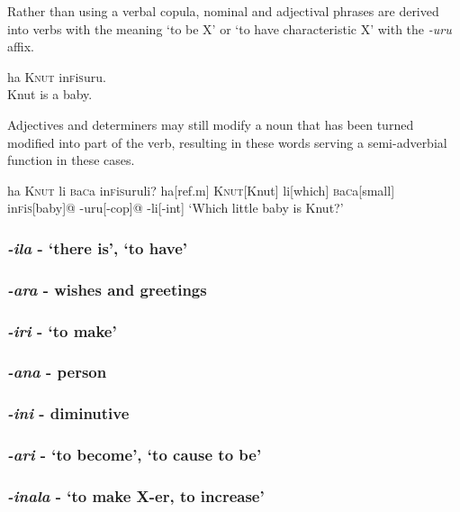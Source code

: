 \documentclass[a4paper,10pt,twoside,openright]{memoir}
\newcommand{\famwordold}[5]{#1\textsc{#2}#3\textsc{#4}#5}
\begin{document}
Rather than using a verbal copula, nominal and adjectival phrases are derived into verbs with the meaning `to be X' or `to have characteristic X' with the \emph{-uru} affix. 

\ex
ha \textsc{Knut} \famwordold{in}{f}{i}{s}{uru}.\\
Knut is a baby.
\xe

Adjectives and determiners may still modify a noun that has been turned modified into part of the verb, resulting in these words serving a semi-adverbial function in these cases. 

\ex
\begingl
\glpreamble
ha \textsc{Knut} li \famwordold{}{b}{a}{c}{a} \famwordold{in}{f}{i}{s}{uruli}?
\endpreamble
ha[\sc ref.m]
\textsc{Knut}[Knut]
li[which]
\famwordold{}{b}{a}{c}{a}[small]
\famwordold{in}{f}{i}{s}{}[baby]@
-uru[\sc -cop]@
-li[\sc -int]
\glft
`Which little baby is Knut?'
\endgl
\xe

\subsubsection{\emph{-ila} - `there is', `to have'}

\subsubsection{\emph{-ara} - wishes and greetings}

\subsubsection{\emph{-iri} - `to make'}

\subsubsection{\emph{-ana} - person}

\subsubsection{\emph{-ini} - diminutive}

\subsubsection{\emph{-ari} - `to become', `to cause to be'}

\subsubsection{\emph{-inala} - `to make X-er, to increase'}
\end{document}
